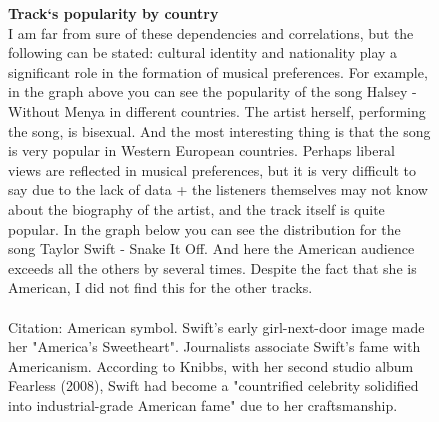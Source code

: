 \documentclass{article}
\begin{document}
\begin{figure}[htbp]
    \caption{\textbf{Track`s popularity by country} \\ 
    I am far from sure of these dependencies and correlations, but the following can be stated: cultural identity and nationality play a significant role in the formation of musical preferences. For example, in the graph above you can see the popularity of the song Halsey - Without Menya in different countries. The artist herself, performing the song, is bisexual. And the most interesting thing is that the song is very popular in Western European countries. Perhaps liberal views are reflected in musical preferences, but it is very difficult to say due to the lack of data + the listeners themselves may not know about the biography of the artist, and the track itself is quite popular. In the graph below you can see the distribution for the song Taylor Swift - Snake It Off. And here the American audience exceeds all the others by several times. Despite the fact that she is American, I did not find this for the other tracks.\\\\
Citation: American symbol. Swift's early girl-next-door image made her "America's Sweetheart". Journalists associate Swift's fame with Americanism. According to Knibbs, with her second studio album Fearless (2008), Swift had become a "countrified celebrity solidified into industrial-grade American fame" due to her craftsmanship.}
    \label{fig:itunes_combined}
\end{figure}

\clearpage
\end{document}
